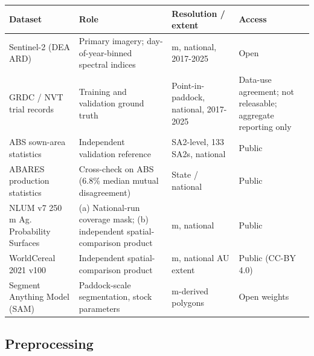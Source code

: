 \begin{longtable}[]{@{}
  >{\raggedright\arraybackslash}p{}
  >{\raggedright\arraybackslash}p{}
  >{\raggedright\arraybackslash}p{}
  >{\raggedright\arraybackslash}p{}@{}}
\toprule\noalign{}
\begin{minipage}[b]{\linewidth}\raggedright
Dataset
\end{minipage} & \begin{minipage}[b]{\linewidth}\raggedright
Role
\end{minipage} & \begin{minipage}[b]{\linewidth}\raggedright
Resolution / extent
\end{minipage} & \begin{minipage}[b]{\linewidth}\raggedright
Access
\end{minipage} \\
\midrule\noalign{}
\endhead
\bottomrule\noalign{}
\endlastfoot
Sentinel-2 (DEA ARD) & Primary imagery; day-of-year-binned spectral indices & 10 m, national, 2017-2025 & Open \\
GRDC / NVT trial records & Training and validation ground truth & Point-in-paddock, national, 2017-2025 & Data-use agreement; not releasable; aggregate reporting only \\
ABS sown-area statistics & Independent validation reference & SA2-level, 133 SA2s, national & Public \\
ABARES production statistics & Cross-check on ABS (6.8\% median mutual disagreement) & State / national & Public \\
NLUM v7 250 m Ag. Probability Surfaces & (a) National-run coverage mask; (b) independent spatial-comparison product & 250 m, national & Public \\
WorldCereal 2021 v100 & Independent spatial-comparison product & 10 m, national AU extent & Public (CC-BY 4.0) \\
Segment Anything Model (SAM) & Paddock-scale segmentation, stock parameters & 10 m-derived polygons & Open weights \\
\end{longtable}


\subsection{Preprocessing}\label{preprocessing}


